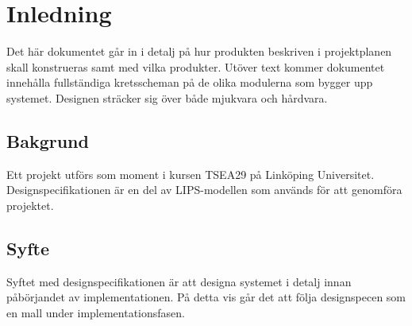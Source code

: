 \documentclass[designspec/spec.tex]{subfiles}
\begin{document}
\section{Inledning}
Det här dokumentet går in i detalj på hur produkten beskriven i projektplanen
skall konstrueras samt med vilka produkter. Utöver text kommer dokumentet
innehålla fullständiga kretsscheman på de olika modulerna som bygger upp
systemet. Designen sträcker sig över både mjukvara och hårdvara.

\subsection{Bakgrund}
Ett projekt utförs som moment i kursen TSEA29 på Linköping Universitet.
Designspecifikationen är en del av LIPS-modellen som används för att genomföra
projektet.

\subsection{Syfte}
Syftet med designspecifikationen är att designa systemet i detalj innan
påbörjandet av implementationen. På detta vis går det att följa designspecen
som en mall under implementationsfasen.
\end{document}
